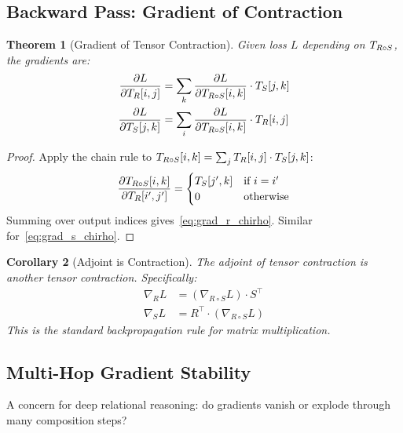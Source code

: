 \documentclass[11pt,a4paper]{article}
\newtheorem{theorem}{Theorem}
\newtheorem{corollary}[theorem]{Corollary}
\begin{document}
\subsection{Backward Pass: Gradient of Contraction}
\label{subsec:backward_chirho}

\begin{theorem}[Gradient of Tensor Contraction]
\label{thm:contraction_grad_chirho}
Given loss $L$ depending on $T_{R \circ S}$, the gradients are:
\begin{align}
\frac{\partial L}{\partial T_{R}[i, j]} &= \sum_k \frac{\partial L}{\partial T_{R \circ S}[i, k]} \cdot T_{S}[j, k] \label{eq:grad_r_chirho} \\
\frac{\partial L}{\partial T_{S}[j, k]} &= \sum_i \frac{\partial L}{\partial T_{R \circ S}[i, k]} \cdot T_{R}[i, j] \label{eq:grad_s_chirho}
\end{align}
\end{theorem}

\begin{proof}
Apply the chain rule to $T_{R \circ S}[i, k] = \sum_j T_{R}[i, j] \cdot T_{S}[j, k]$:
\[
\frac{\partial T_{R \circ S}[i, k]}{\partial T_{R}[i', j']} = \begin{cases}
T_{S}[j', k] & \text{if } i = i' \\
0 & \text{otherwise}
\end{cases}
\]
Summing over output indices gives~\eqref{eq:grad_r_chirho}. Similar for~\eqref{eq:grad_s_chirho}.
\end{proof}

\begin{corollary}[Adjoint is Contraction]
\label{cor:adjoint_contraction_chirho}
The adjoint of tensor contraction is another tensor contraction.
Specifically:
\begin{align*}
\nabla_R L &= (\nabla_{R \circ S} L) \cdot S^\top \\
\nabla_S L &= R^\top \cdot (\nabla_{R \circ S} L)
\end{align*}
This is the standard backpropagation rule for matrix multiplication.
\end{corollary}

\subsection{Multi-Hop Gradient Stability}
\label{subsec:gradient_stability_chirho}

A concern for deep relational reasoning: do gradients vanish or explode through many composition steps?
\end{document}
